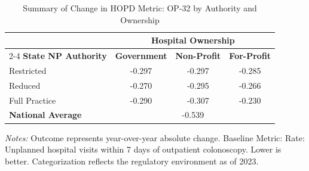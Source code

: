 \begin{table}[htbp]
    \centering
    \caption{Summary of Change in HOPD Metric: OP-32 by Authority and Ownership}
    \label{tab:d_hopd_op_32_own}
    \vspace{0.2cm}
    \begin{tabular}{lccc}
        \toprule
        & \multicolumn{3}{c}{\textbf{Hospital Ownership}} \\
        \cmidrule(lr){2-4}
        \textbf{State NP Authority} & \textbf{Government} & \textbf{Non-Profit} & \textbf{For-Profit} \\
        \midrule
        Restricted & -0.297 & -0.297 & -0.285 \\
        Reduced & -0.270 & -0.295 & -0.266 \\
        Full Practice & -0.290 & -0.307 & -0.230 \\
        \midrule
        \textbf{National Average} & \multicolumn{3}{c}{-0.539} \\
        \bottomrule
    \end{tabular}
    \vspace{0.1cm}
    \begin{minipage}{0.85\textwidth}
        \footnotesize \textit{Notes:} Outcome represents year-over-year absolute change. Baseline Metric: Rate: Unplanned hospital visits within 7 days of outpatient colonoscopy. Lower is better. Categorization reflects the regulatory environment as of 2023.
    \end{minipage}
\end{table}